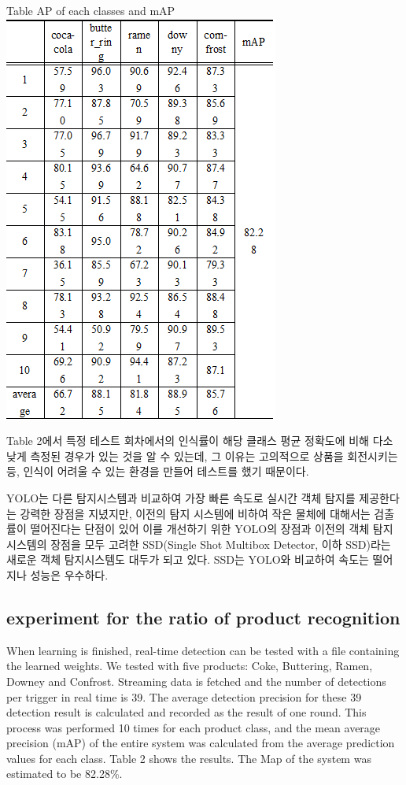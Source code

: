 \documentclass[smallextended]{svjour3}       %
\begin{document}
Table AP of each classes and mAP \includegraphics{../fig/table2.png}

Table 2에서 특정 테스트 회차에서의 인식률이 해당 클래스 평균 정확도에
비해 다소 낮게 측정된 경우가 있는 것을 알 수 있는데, 그 이유는
고의적으로 상품을 회전시키는 등, 인식이 어려울 수 있는 환경을 만들어
테스트를 했기 때문이다.

YOLO는 다른 탐지시스템과 비교하여 가장 빠른 속도로 실시간 객체 탐지를
제공한다는 강력한 장점을 지녔지만, 이전의 탐지 시스템에 비하여 작은
물체에 대해서는 검출률이 떨어진다는 단점이 있어 이를 개선하기 위한
YOLO의 장점과 이전의 객체 탐지 시스템의 장점을 모두 고려한 SSD(Single
Shot Multibox Detector, 이하 SSD)라는 새로운 객체 탐지시스템도 대두가
되고 있다. SSD는 YOLO와 비교하여 속도는 떨어지나 성능은
우수하다\cite{ren2015faster, liu2016ssd}.

\hypertarget{experiment-for-the-ratio-of-product-recognition}{%
\subsection{experiment for the ratio of product
recognition}\label{experiment-for-the-ratio-of-product-recognition}}

When learning is finished, real-time detection can be tested with a file
containing the learned weights. We tested with five products: Coke,
Buttering, Ramen, Downey and Confrost. Streaming data is fetched and the
number of detections per trigger in real time is 39. The average
detection precision for these 39 detection result is calculated and
recorded as the result of one round. This process was performed 10 times
for each product class, and the mean average precision (mAP) of the
entire system was calculated from the average prediction values for each
class. Table 2 shows the results. The Map of the system was estimated to
be 82.28\%.
\end{document}
